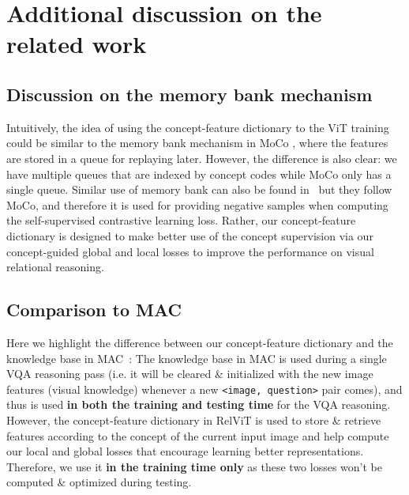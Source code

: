 \documentclass{article} \usepackage{iclr2022_conference,times}
\begin{document}
\section{Additional discussion on the related work}

\subsection{Discussion on the memory bank mechanism}

Intuitively, the idea of using the concept-feature dictionary to the ViT training could be similar to the memory bank mechanism in MoCo \citep{moco}, where the features are stored in a queue for replaying later. However, the difference is also clear: we have multiple queues that are indexed by concept codes while MoCo only has a single queue. Similar use of memory bank can also be found in~\cite{wu2018unsupervised,tian2020contrastive} but they follow MoCo, and therefore it is used for providing negative samples when computing the self-supervised contrastive learning loss. Rather, our concept-feature dictionary is designed to make better use of the concept supervision via our concept-guided global and local losses to improve the performance on visual relational reasoning.

\subsection{Comparison to MAC~\citep{mac}}

Here we highlight the difference between our concept-feature dictionary and the knowledge base in MAC~\citep{mac}: The knowledge base in MAC is used during a single VQA reasoning pass (i.e. it will be cleared \& initialized with the new image features (visual knowledge) whenever a new \texttt{<image, question>} pair comes), and thus is used \textbf{in both the training and testing time} for the VQA reasoning. However, the concept-feature dictionary in RelViT is used to store \& retrieve features according to the concept of the current input image and help compute our local and global losses that encourage learning better representations. Therefore, we use it \textbf{in the training time only} as these two losses won’t be computed \& optimized during testing.

 
\end{document}
